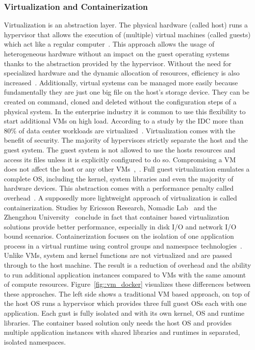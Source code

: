 \documentclass[12pt, a4paper]{article}
\begin{document}
        \subsubsection{Virtualization and Containerization}\label{sssec::virtual}
        Virtualization is an abstraction layer. The physical hardware (called host) runs a hypervisor that allows the execution of (multiple) virtual machines (called guests) which act like a regular computer~\cite{vmbasics}. This approach allows the usage of heterogeneous hardware without an impact on the guest operating systems thanks to the abstraction provided by the hypervisor. Without the need for specialized hardware and the dynamic allocation of resources, efficiency is also increased~\cite{redhat_venv}. Additionally, virtual systems can be managed more easily because fundamentally they are just one big file on the host's storage device. They can be created on command, cloned and deleted without the configuration steps of a physical system. In the enterprise industry it is common to use this flexibility to start additional \ac{VM}s on high load. According to a study by the \ac{IDC} more than 80\% of data center workloads are virtualized~\cite{virtualaddoption}. Virtualization comes with the benefit of security. The majority of hypervisors strictly separate the host and the guest system. The guest system is not allowed to use the hosts resources and access its files unless it is explicitly configured to do so. Compromising a \ac{VM} does not affect the host or any other \ac{VM}s~\cite{vmbasics},~\cite{redhat_venv}.\newline
        Full guest virtualization emulates a complete \ac{OS}, including the kernel, system libraries and even the majority of hardware devices. This abstraction comes with a performance penalty called overhead~\cite{vmbasics}. A supposedly more lightweight approach of virtualization is called containerization. Studies by Ericsson Research, Nomadic Lab~\cite{ieee_perfomance} and the Zhengzhou University~\cite{zhengzhou_university} conclude in fact that container based virtualization solutions provide better performance, especially in disk \acs{I/O} and network \acs{I/O} bound scenarios. Containerization focuses on the isolation of one application process in a virtual runtime using control groups and namespace technologies~\cite{cgroups}. Unlike \ac{VM}s, system and kernel functions are not virtualized and are passed through to the host machine. The result is a reduction of overhead and the ability to run additional application instances compared to \ac{VM}s with the same amount of compute resources. Figure~\ref{fig::vm_docker} visualizes these differences between these approaches. The left side shows a traditional \ac{VM} based approach, on top of the host \ac{OS} runs a hypervisor which provides three full guest \acl{OS}s each with one application. Each gust is fully isolated and with its own kernel, \ac{OS} and runtime libraries. The container based solution only needs the host \ac{OS} and provides multiple application instances with shared libraries and runtimes in separated, isolated namespaces.\newline
\end{document}
